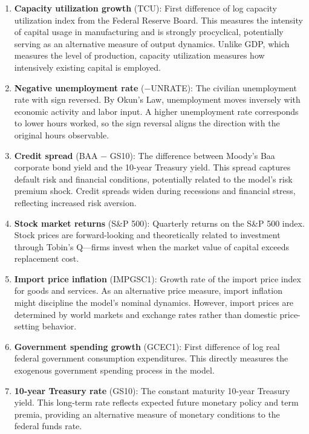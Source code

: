 \documentclass[12pt]{article}
\begin{document}
\begin{enumerate}
    \item \textbf{Capacity utilization growth} (TCU): First difference of log capacity utilization index from the Federal Reserve Board. This measures the intensity of capital usage in manufacturing and is strongly procyclical, potentially serving as an alternative measure of output dynamics. Unlike GDP, which measures the level of production, capacity utilization measures how intensively existing capital is employed.
    
    \item \textbf{Negative unemployment rate} ($-$UNRATE): The civilian unemployment rate with sign reversed. By Okun's Law, unemployment moves inversely with economic activity and labor input. A higher unemployment rate corresponds to lower hours worked, so the sign reversal aligns the direction with the original hours observable.
    
    \item \textbf{Credit spread} (BAA $-$ GS10): The difference between Moody's Baa corporate bond yield and the 10-year Treasury yield. This spread captures default risk and financial conditions, potentially related to the model's risk premium shock. Credit spreads widen during recessions and financial stress, reflecting increased risk aversion.
    
    \item \textbf{Stock market returns} (S\&P 500): Quarterly returns on the S\&P 500 index. Stock prices are forward-looking and theoretically related to investment through Tobin's Q---firms invest when the market value of capital exceeds replacement cost.
    
    \item \textbf{Import price inflation} (IMPGSC1): Growth rate of the import price index for goods and services. As an alternative price measure, import inflation might discipline the model's nominal dynamics. However, import prices are determined by world markets and exchange rates rather than domestic price-setting behavior.
    
    \item \textbf{Government spending growth} (GCEC1): First difference of log real federal government consumption expenditures. This directly measures the exogenous government spending process in the model.
    
    \item \textbf{10-year Treasury rate} (GS10): The constant maturity 10-year Treasury yield. This long-term rate reflects expected future monetary policy and term premia, providing an alternative measure of monetary conditions to the federal funds rate.
\end{enumerate}
\end{document}
